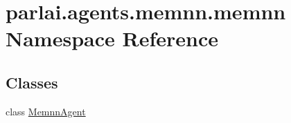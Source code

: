 \hypertarget{namespaceparlai_1_1agents_1_1memnn_1_1memnn}{}\section{parlai.\+agents.\+memnn.\+memnn Namespace Reference}
\label{namespaceparlai_1_1agents_1_1memnn_1_1memnn}
\subsection*{Classes}
\begin{DoxyCompactItemize}
\item 
class \hyperlink{classparlai_1_1agents_1_1memnn_1_1memnn_1_1MemnnAgent}{Memnn\+Agent}
\end{DoxyCompactItemize}
